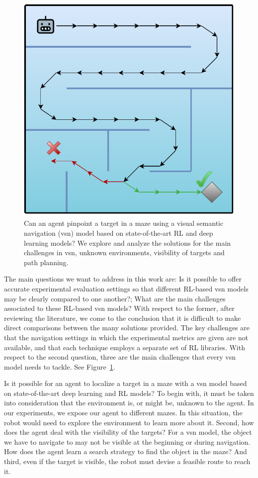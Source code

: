 \begin{figure}[t]
  \centering
   \includegraphics[width=0.6\linewidth]{figures/understanding_vsn/graphical_abstract}
   \caption{Can an agent pinpoint a target in a maze using a visual semantic navigation (\acrshort{vsn}) model based on state-of-the-art RL and deep learning models? We explore and analyze the solutions for the main challenges in \acrshort{vsn}, \ie unknown environments, visibility of targets and path planning.}
   \label{fig:graphical_abstract}
\end{figure}

The main questions we want to address in this work are: Is it possible to offer accurate experimental evaluation settings so that different RL-based \acrshort{vsn} models may be clearly compared to one another?; What are the main challenges associated to these RL-based \acrshort{vsn} models?
With respect to the former, after reviewing the literature, we come to the conclusion that it is difficult to make direct comparisons between the many solutions provided.
The key challenges are that the navigation settings in which the experimental metrics are given are not available, and that each technique employs a separate set of RL libraries.
With respect to the second question, three are the main challenges that every \acrshort{vsn} model needs to tackle.
See Figure~\ref{fig:graphical_abstract}.

Is it possible for an agent to localize a target in a maze with a \acrshort{vsn} model based on state-of-the-art deep learning and RL models?
To begin with, it must be taken into consideration that the environment is, or might be, unknown to the agent.
In our experiments, we expose our agent to different mazes.
In this situation, the robot would need to explore the environment to learn more about it.
Second, how does the agent deal with the visibility of the targets?
For a \acrshort{vsn} model, the object we have to navigate to may not be visible at the beginning or during navigation.
How does the agent learn a search strategy to find the object in the maze?
And third, even if the target is visible, the robot must devise a feasible route to reach it.



